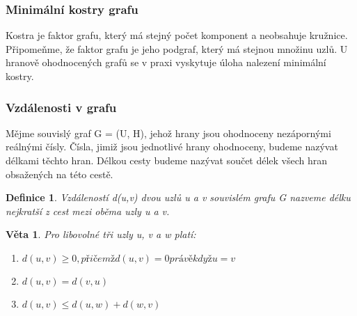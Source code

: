 \documentclass[10pt,a4paper]{article}
\newtheorem{veta}{Věta}
\newtheorem{definition}{Definice}
\begin{document}
\subsubsection{Minimální kostry grafu}
Kostra je faktor grafu, který má stejný počet komponent a neobsahuje kružnice.
Připomeňme, že faktor grafu je jeho podgraf, který má stejnou množinu uzlů.
U hranově ohodnocených grafů se v praxi vyskytuje úloha nalezení minimální kostry.
\subsubsection{Vzdálenosti v grafu}
Mějme souvislý graf G = (U, H), jehož hrany jsou ohodnoceny nezápornými reálnými čísly. Čísla, jimiž jsou jednotlivé hrany ohodnoceny, budeme nazývat délkami těchto hran. Délkou cesty budeme nazývat součet délek všech hran obsažených na této cestě.
\begin{definition}
Vzdáleností d(u,v) dvou uzlů u a v souvislém grafu G nazveme délku nejkratší z cest mezi oběma uzly u a v.
\end{definition}
\begin{veta}
Pro libovolné tři uzly u, v a w platí:
\begin{enumerate}
	\item $d(u, v) \geq 0, přičemž d(u, v) = 0 právě když u = v$
	\item $d(u, v) = d(v, u)$
	\item $d(u, v) \leq d(u, w) + d(w, v)$
\end{enumerate}
\end{veta}
\end{document}

